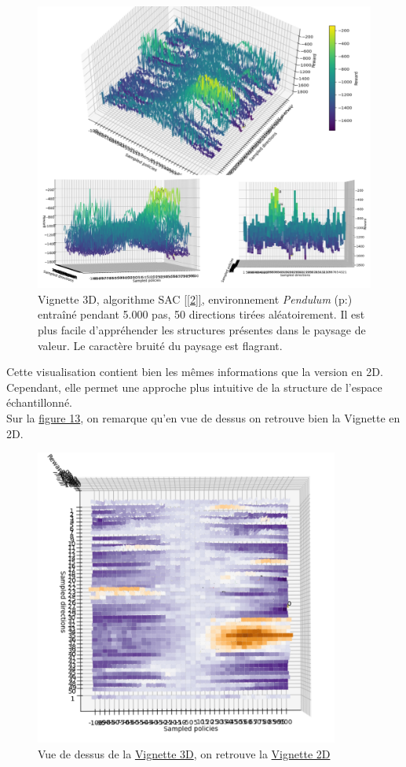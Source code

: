 \documentclass[12pt]{article}
\begin{document}
\begin{figure}[htp]
    \centering
    \includegraphics[width=15cm]{Images/vignette_3D}
    \caption{Vignette 3D, algorithme SAC  \ref{[2]}, environnement \emph{Pendulum} (p:\pageref{second}) entraîné pendant 5.000 pas, 50 directions tirées aléatoirement. Il est plus facile d'appréhender les structures présentes dans le paysage de valeur. Le caractère bruité du paysage est flagrant.}
    \label{fig:vignette3D}
\end{figure}

Cette visualisation contient bien les mêmes informations que la version en 2D. Cependant, elle permet une approche plus intuitive de la structure de l'espace échantillonné. \\

Sur la \hyperref[fig:vignetteDessus]{figure 13}, on remarque qu'en vue de dessus on retrouve bien la Vignette en 2D. \\

\begin{figure}[htp]
    \centering
    \includegraphics[width=10cm]{Images/vignette_dessus}
    \caption{Vue de dessus de la \hyperref[fig:vignette3D]{Vignette 3D}, on retrouve la \hyperref[fig:vignettePendulum]{Vignette 2D}}
    \label{fig:vignetteDessus}
\end{figure}
\end{document}
